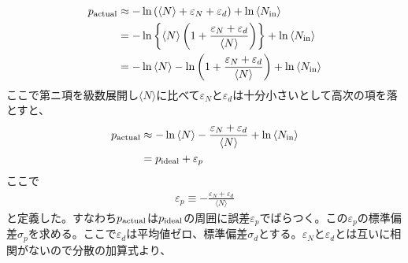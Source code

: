 \begin{align}
p_{\rm actual}&\approx-\ln{(\langle N \rangle + \varepsilon_N + \varepsilon_d)}+\ln{\langle N_{\rm in} \rangle}\\
&=-\ln\left\{\langle N \rangle\left(1+\frac{\varepsilon_N+\varepsilon_d}{\langle N \rangle} \right)\right\}+\ln{\langle N_{\rm in} \rangle}\\
&=-\ln{\langle N \rangle}-\ln\left(1+\frac{\varepsilon_N+\varepsilon_d}{\langle N \rangle} \right)+\ln{\langle N_{\rm in} \rangle}\\
\end{align}
ここで第ニ項を級数展開し$\langle N \rangle$に比べて$\varepsilon_N$と$\varepsilon_d$は十分小さいとして高次の項を落とすと、
\begin{align}
p_{\rm actual}&\approx-\ln{\langle N \rangle}-\frac{\varepsilon_N+\varepsilon_d}{\langle N \rangle}+\ln{\langle N_{\rm in} \rangle}\\
&=p_{\rm ideal} + \varepsilon_p
\end{align}
ここで
\begin{align}
\varepsilon_p\equiv-\frac{\varepsilon_N+\varepsilon_d}{\langle N \rangle}
\end{align}
と定義した。すなわち$p_{\rm actual}$は$p_{\rm ideal}$の周囲に誤差$\varepsilon_p$でばらつく。この$\varepsilon_p$の標準偏差$\sigma_p$を求める。ここで$\varepsilon_d$は平均値ゼロ、標準偏差$\sigma_d$とする。$\varepsilon_N$と$\varepsilon_d$とは互いに相関がないので分散の加算式より、

